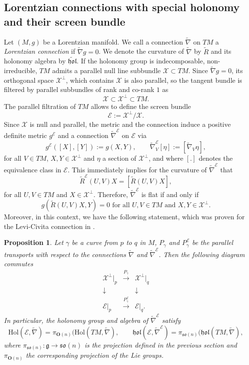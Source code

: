 \documentclass[11pt,a4paper]{amsart}
\newcommand{\p}{\mathfrak{p}}
\newcommand{\tnab}{\widetilde{\nabla}}
\newcommand{\tR}{\widetilde{R}}
\newcommand{\tRE}{\widetilde{R}^{\E}}
\newcommand{\g}{\mathfrak{g}}
\newcommand{\hol}{\mathfrak{hol}}
\newcommand{\stab}{\mathfrak{stab}}
\newcommand{\Hol}{\mathrm{Hol}}
\newcommand{\+}{\oplus}
\newcommand{\so}{\mathfrak{so}}
\renewcommand{\O}{\mathbf{O}}
\newcommand{\1}{\mathbf{1}}
\newcommand{\e}{\mathrm{e}}
\newcommand{\End}{\mathrm{End}}
\newcommand{\R}{\mathbb{R}} %
\newcommand{\E}{\mathcal{E}}
\newcommand{\G}{\mathcal{G}}
\renewcommand{\P}{\mathcal{P}}
\newcommand{\tnabE}{\tnab^{\mathcal{E}}}
\newcommand{\<}{\langle}
\renewcommand{\>}{\rangle}
\theoremstyle{definition}
\theoremstyle{plain}
\newtheorem{proposition}[definition]{Proposition}
\numberwithin{equation}{section}
\begin{document}
\subsection{Lorentzian connections with special holonomy and their screen bundle} 
\label{screensec}
Let $(M,g)$ be a Lorentzian manifold. We call a connection $\tnab$ on $TM$ a {\em Lorentzian connection} if $\tnab g=0$. We denote the curvature of $\tnab$ by $\tR$ and its holonomy algebra by $\widetilde{\hol}$.
If the holonomy group is indecomposable, non-irreducible, $TM$ admits a parallel null line subbundle  $\mathcal X\subset TM$. 
Since $\tnab g=0$, its orthogonal space $\mathcal X^\perp$, which contains $\mathcal X$ is also parallel, so the tangent bundle is filtered by parallel subbundles of rank and co-rank $1$ as
\[ \mathcal X\subset \mathcal X^\perp\subset  TM.\]
The parallel filtration of $TM$ allows to define the screen bundle 
\[\E:=\mathcal X^\perp/\mathcal X.\] 
Since $\mathcal X$ is null and parallel,   the metric and the connection induce a positive definite metric $g^{\E}$ and a connection $\tnab^{\E}$ on $\E$ via
\[ g^{\E}([X],[Y]):= g(X,Y),\qquad \tnabE_V[\eta]:=[\tnab_V \eta ],\]
for all $V\in TM$, $X,Y\in \mathcal X^\perp$ and $\eta$ a section of $\mathcal X^\perp$, and where $[.]$ denotes the equivalence class in $\E$.
This immediately implies for the curvature of $\tnabE$ that
\[\tRE(U,V)X=[ \tR (U,V) X],\]
for all $U,V\in TM$ and $X\in \mathcal X^\perp$.
Therefore, $\tnab^{\E}$ is flat if and only if  \[g(\tR (U,V) X,Y)=0\text{ for all $U,V\in TM$ and $X,Y\in \mathcal X^\perp$.}\]
Moreover, in this context, we have the following statement, which was proven for the Levi-Civita connection in \cite{leistner05c}.
\begin{proposition}
Let $\gamma$ be a curve from $p$ to $q$ in $M$, $P_\gamma$ and $P^{\E}_\gamma$ be the parallel transports with respect to the connections $\tnab$ and $\tnabE$. Then the following diagram commutes
\begin{eqnarray}\nonumber
\mathcal X^\perp|_p& \stackrel{P_\gamma}{\longrightarrow} & \mathcal X^\perp|_q
\\
\label{cd}
\downarrow&&\downarrow
\\
\nonumber
\E|_p& \stackrel{P^\E_\gamma}{\longrightarrow} & \E|_q.\end{eqnarray}
In particular, the holonomy group and algebra of $\tnabE$ satisfy 
\[
\Hol (\E,\tnab) =\pi_{\O(n)}( \Hol(TM,\tnab), \qquad
\hol(\E,\tnabE)=\pi_{\so(n)}( \hol(TM,\tnab),\]
where $\pi_{\so(n)}: \g\to \so(n)$ is the projection defined in the previous section and $\pi_{\O(n)}$ the corresponding projection of the Lie groups.
\end{proposition}
\end{document}
